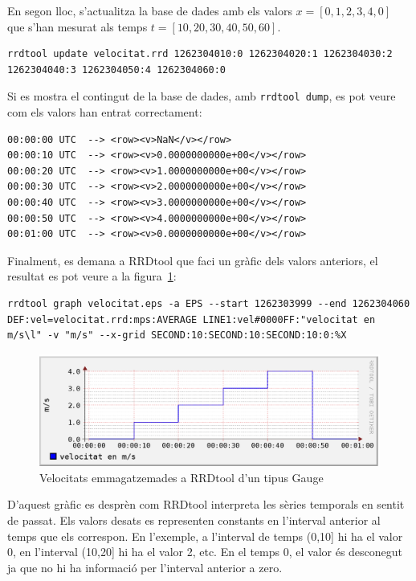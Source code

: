 En segon lloc, s'actualitza la base de dades amb els valors $x=[0,1,2,3,4,0]$ que s'han mesurat als temps $t=[10,20,30,40,50,60]$.
\begin{lstlisting}[style=sh]
rrdtool update velocitat.rrd 1262304010:0 1262304020:1 1262304030:2 1262304040:3 1262304050:4 1262304060:0
\end{lstlisting}

Si es mostra el contingut de la base de dades, amb \verb+rrdtool dump+, es pot veure com els valors han entrat correctament:
\begin{lstlisting}
00:00:00 UTC  --> <row><v>NaN</v></row>
00:00:10 UTC  --> <row><v>0.0000000000e+00</v></row>
00:00:20 UTC  --> <row><v>1.0000000000e+00</v></row>
00:00:30 UTC  --> <row><v>2.0000000000e+00</v></row>
00:00:40 UTC  --> <row><v>3.0000000000e+00</v></row>
00:00:50 UTC  --> <row><v>4.0000000000e+00</v></row>
00:01:00 UTC  --> <row><v>0.0000000000e+00</v></row>
\end{lstlisting}


Finalment, es demana a RRDtool que faci un gràfic dels valors anteriors, el resultat es pot veure a la figura~\ref{fig:rrdtool:velocitat}:
\begin{lstlisting}[style=sh]
rrdtool graph velocitat.eps -a EPS --start 1262303999 --end 1262304060 DEF:vel=velocitat.rrd:mps:AVERAGE LINE1:vel#0000FF:"velocitat en m/s\l" -v "m/s" --x-grid SECOND:10:SECOND:10:SECOND:10:0:%X
\end{lstlisting}

\begin{figure}[htp]
  \centering
  \includegraphics[width=\textwidth]{imatges/rrdtool/velocitat.eps}
  \caption{Velocitats emmagatzemades a RRDtool d'un tipus Gauge}
  \label{fig:rrdtool:velocitat}
\end{figure}



D'aquest gràfic es desprèn com RRDtool interpreta les sèries temporals en sentit de passat. Els valors desats es representen constants en l'interval anterior al temps que els correspon. En l'exemple, a l'interval de temps (0,10] hi ha el valor 0, en l'interval (10,20] hi ha el valor 2, etc. En el temps 0, el valor és desconegut ja que no hi ha informació per l'interval anterior a zero.


